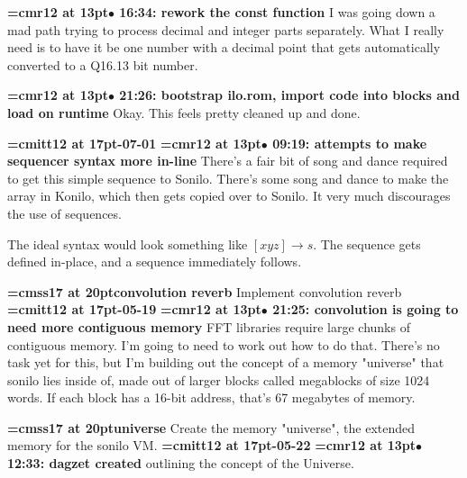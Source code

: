 {\smallskip\noindent\bf\font\titlefont=cmr12 at 13pt\titlefont $\bullet$ 16:34: rework the const function}\smallskip
I was going down a mad path trying to process decimal and integer parts separately. What I really need is to have it be one number with a decimal point that gets automatically converted to a Q16.13 bit number.
\par

{\smallskip\noindent\bf\font\titlefont=cmr12 at 13pt\titlefont $\bullet$ 21:26: bootstrap ilo.rom, import code into blocks and load on runtime}\smallskip
Okay. This feels pretty cleaned up and done.
\par

{\medskip\noindent\bf\font\titlefont=cmitt12 at 17pt-07-01}\medskip
{\smallskip\noindent\bf\font\titlefont=cmr12 at 13pt\titlefont $\bullet$ 09:19: attempts to make sequencer syntax more in-line}\smallskip
There's a fair bit of song and dance required to get this simple sequence to Sonilo. There's some song and dance to make the array in Konilo, which then gets copied over to Sonilo. It very much discourages the use of sequences.
\par

The ideal syntax would look something like $[x y z] \to s$. The sequence gets defined in-place, and a sequence immediately follows.
\par

{\medskip\noindent\bf\font\titlefont=cmss17 at 20pt\titlefont convolution reverb}\medskip
Implement convolution reverb
{\medskip\noindent\bf\font\titlefont=cmitt12 at 17pt-05-19}\medskip
{\smallskip\noindent\bf\font\titlefont=cmr12 at 13pt\titlefont $\bullet$ 21:25: convolution is going to need more contiguous memory}\smallskip
FFT libraries require large chunks of contiguous memory. I'm going to need to work out how to do that. There's no task yet for this, but I'm building out the concept of a memory "universe" that sonilo lies inside of, made out of larger blocks called megablocks of size 1024 words. If each block has a 16-bit address, that's 67 megabytes of memory.
\par

{\medskip\noindent\bf\font\titlefont=cmss17 at 20pt\titlefont universe}\medskip
Create the memory "universe", the extended memory for
the sonilo VM.
{\medskip\noindent\bf\font\titlefont=cmitt12 at 17pt-05-22}\medskip
{\smallskip\noindent\bf\font\titlefont=cmr12 at 13pt\titlefont $\bullet$ 12:33: dagzet created}\smallskip
outlining the concept of the Universe.
\par


